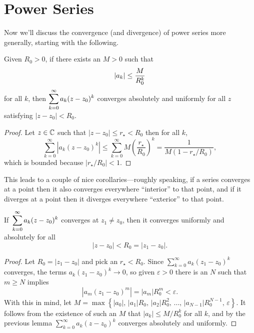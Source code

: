 \documentclass[../m136main.tex]{subfiles}
\begin{document}
\section{Power Series}
Now we'll discuss the convergence (and divergence) of power series more generally, starting with the following.

\begin{lemma}    %
    Given $R_0 > 0$, if there exists an $M > 0$ such that
    \[ |a_k| \leq \frac{M}{R_0^{k}} \vspace{-6pt} \]
    for all $k$, then $\displaystyle \sum_{k=0}^{\infty} a_k (z - z_0)^{k}$ converges absolutely and uniformly for all $z$ satisfying $|z - z_0| < R_0$.
\end{lemma}

\begin{proof}
    Let $z \in \mathbb{C}$ such that $|z - z_0| \leq r_\star < R_0$ then for all $k$,
    \[ \sum_{k=0}^{\infty} |a_k (z - z_0)^{k}| \leq \sum_{k=0}^{\infty} M \left( \frac{r_\star}{R_0} \right)^{k} = \frac{1}{M (1 - r_\star / R_0)}, \]
    which is bounded because $|r_\star / R_0| < 1$.
\end{proof}


This leads to a couple of nice corollaries---roughly speaking, if a series converges at a point then it also converges everywhere ``interior'' to that point, and if it diverges at a point then it diverges everywhere ``exterior'' to that point.

\pagebreak

\begin{corollary}[]
    \vspace{-4pt} If $\,\displaystyle \sum_{k=0}^{\infty} a_k (z - z_0)^{k}$ converges at $z_1 \neq z_0$, then it converges uniformly and absolutely for all  \vspace{-6pt}
    \[ |z - z_0| < R_0 = |z_1 - z_0|. \]
\end{corollary}

\begin{proof}
    Let $R_0 = |z_1 - z_0|$ and pick an $r_\star < R_0$.
    Since $\sum_{k=0}^{\infty} a_k (z_1 - z_0)^{k}$ converges, the terms $a_k (z_1 - z_0)^{k} \to 0$, so given $\varepsilon > 0$ there is an $N$ such that $m \geq N$ implies
    \[ |a_m (z_1 - z_0)^{m}| = |a_m| R_0^{m} < \varepsilon. \]
    With this in mind, let $M = \max \left\{ |a_0|, \, |a_1| R_0, \, |a_2| R_0^2, \, \ldots, \, |a_{N-1}| R_0^{N-1}, \, \varepsilon \right\}$.
    It follows from the existence of such an $M$ that $|a_k| \leq M / R_0^{k}$ for all $k$, and by the previous lemma $\sum_{k=0}^{\infty} a_k (z - z_0)^{k}$ converges absolutely and uniformly.
\end{proof}
\end{document}

